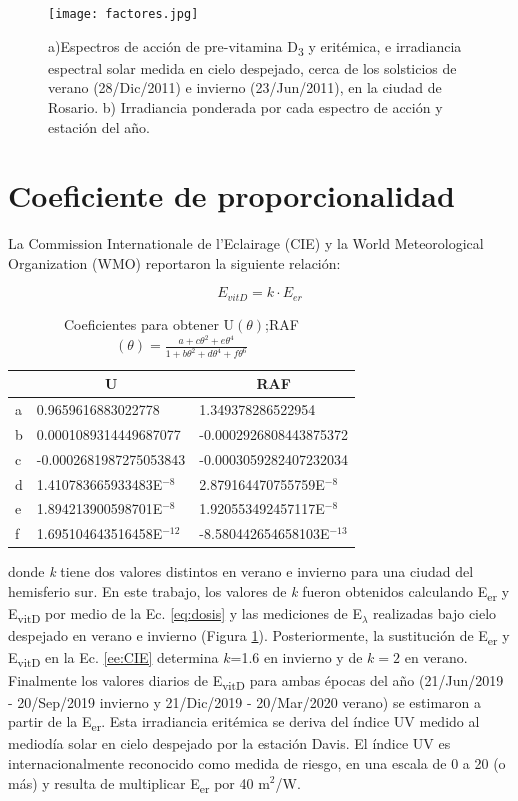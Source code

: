 \documentclass[10pt,twocolumn]{article}
\begin{document}
\begin{figure}[ht]
  \centering
  \texttt{[image: factores.jpg]}
  \caption{a)Espectros de acción de pre-vitamina D\textsubscript{3} y eritémica, e irradiancia espectral solar medida en cielo despejado, cerca de los solsticios de verano (28/Dic/2011) e invierno (23/Jun/2011), en la ciudad de Rosario. b) Irradiancia ponderada por cada espectro de acción y estación del año.}
  \label{fig:factores}
\end{figure}

\section{Coeficiente de proporcionalidad}
La Commission Internationale de l’Eclairage (CIE) y la World Meteorological Organization (WMO) reportaron la siguiente relación:

\begin{equation}
  E_{vitD} = k \cdot E_{er}
  \label{ee:CIE}
\end{equation}
\begin{table}[ht]
  \centering
  \caption{Coeficientes\cite{Herman2010} para obtener U$(\theta)$;RAF $(\theta)= \frac{a+c\theta^2+e\theta^4}{1+b\theta^2+d\theta^4+f\theta^6}$}
  \label{table::parametros}
  \begin{tabular}{lll}
    \hline
      & \multicolumn{1}{c}{U}      & \multicolumn{1}{c}{RAF}     \\ \hline
    a & 0.9659616883022778         & 1.349378286522954           \\
    b & 0.0001089314449687077      & -0.0002926808443875372      \\
    c & -0.0002681987275053843     & -0.0003059282407232034      \\
    d & 1.410783665933483E$^{-8 }$ & 2.879164470755759E$^{-8}$   \\
    e & 1.894213900598701E$^{-8 }$ & 1.920553492457117E$^{-8}$   \\
    f & 1.695104643516458E$^{-12}$ & -8.580442654658103E$^{-13}$ \\ \hline
  \end{tabular}
\end{table}

donde \emph{k} tiene dos valores distintos en verano e invierno para una ciudad del hemisferio sur.\cite{UVDoses} En este trabajo, los valores de \emph{k} fueron obtenidos calculando E\textsubscript{er} y E\textsubscript{vitD} por medio de la Ec. \ref{eq:dosis} y las mediciones de E$_\lambda$ realizadas bajo cielo despejado en verano e invierno (Figura \ref{fig:factores}). Posteriormente, la sustitución de E\textsubscript{er} y E\textsubscript{vitD} en la Ec. \ref{ee:CIE} determina $k$=1.6 en invierno y de $k=2$ en verano. Finalmente los valores diarios de E\textsubscript{vitD} para ambas épocas del año (21/Jun/2019 - 20/Sep/2019 invierno y 21/Dic/2019 - 20/Mar/2020 verano) se estimaron a partir de la E\textsubscript{er}. Esta irradiancia eritémica se deriva del índice UV medido al mediodía solar en cielo despejado por la estación Davis. El índice UV es internacionalmente reconocido como medida de riesgo, en una escala de 0 a 20 (o más) y resulta de multiplicar E\textsubscript{er} por 40 m$^2$/W.
\end{document}
